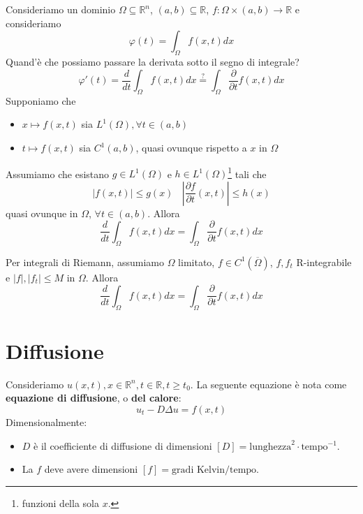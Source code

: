 \documentclass[10pt,a4paper,twoside,openright]{book}
\begin{document}
Consideriamo un dominio $\Omega \subseteq \mathbb{R}^{n}$, $(a,b) \subseteq \mathbb{R}$, $f:\Omega \times (a,b)\rightarrow \mathbb{R}$ e consideriamo
\begin{equation*}
\varphi (t) =\int _{\Omega } f(x,t) dx
\end{equation*}
Quand'è che possiamo passare la derivata sotto il segno di integrale?
\begin{equation*}
\varphi '(t) =\frac{d}{dt}\int _{\Omega } f(x,t) dx\overset{?}{=}\int _{\Omega }\frac{\partial }{\partial t} f(x,t) dx
\end{equation*}
Supponiamo che
\begin{itemize}
\item $\displaystyle x\mapsto f(x,t)$ sia $\displaystyle L^{1}(\Omega),\forall t\in (a,b)$
\item $\displaystyle t\mapsto f(x,t)$ sia $\displaystyle C^{1}(a,b)$, quasi ovunque rispetto a $\displaystyle x$ in $\displaystyle \Omega $
\end{itemize}
\begin{theorem}
Assumiamo che esistano $g\in L^{1}(\Omega)$ e $h\in L^{1}(\Omega)$\footnote{funzioni della sola $x$.} tali che
\begin{equation*}
| f(x,t)| \leqslant g(x) \ \ \ \ \left| \frac{\partial f}{\partial t}(x,t)\right| \leqslant h(x)
\end{equation*}
quasi ovunque in $\displaystyle \Omega $, $\displaystyle \forall t\in (a,b)$. Allora
\begin{equation*}
\frac{d}{dt}\int _{\Omega } f(x,t) dx=\int _{\Omega }\frac{\partial }{\partial t} f(x,t) dx
\end{equation*}
\end{theorem}
Per integrali di Riemann, assumiamo $\Omega $ limitato, $f\in C^{1}(\overline{\Omega })$, $f,f_{t}$ R-integrabile e $| f|,| f_{t}| \leqslant M$ in $\Omega $. Allora
\begin{equation*}
\frac{d}{dt}\int _{\Omega } f(x,t) dx=\int _{\Omega }\frac{\partial }{\partial t} f(x,t) dx
\end{equation*}
\chapter{Diffusione}

Consideriamo $u(x,t),x\in \mathbb{R}^{n},t\in \mathbb{R},t\geqslant t_{0}$. La seguente equazione è nota come \textbf{equazione di diffusione}, o \textbf{del calore}:
\begin{equation*}
\boxed{u_{t} -D\Delta u=f(x,t)}
\end{equation*}
Dimensionalmente:
\begin{itemize}
\item $D$ è il coefficiente di diffusione di dimensioni $[ D] =\text{lunghezza}^{2} \cdotp \text{tempo}^{-1}$.
\item La $f$ deve avere dimensioni $[ f] =\text{gradi Kelvin} /\text{tempo}$.
\end{itemize}
\end{document}
